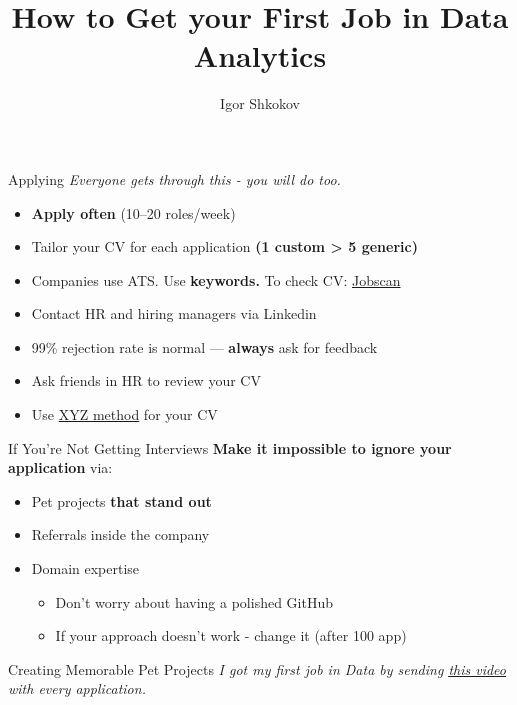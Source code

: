 \documentclass[10pt,a4paper]{article}
\date{} %
\title{How to Get your First Job in \textbf{Data Analytics}}
\author{Igor Shkokov}
\begin{document}
\small
\begin{multicols}{3}

\maketitle
\thispagestyle{empty}
\scriptsize

\begin{textbox}{Applying}
\emph{Everyone gets through this - you will do too.}
\begin{itemize}
    \item \textbf{Apply often} (10--20 roles/week)
    \item Tailor your CV for each application \textbf{(1 custom > 5 generic)}
    \item Companies use ATS. Use \textbf{keywords.} To check CV: \href{https://www.jobscan.co/}{Jobscan}
    \item Contact HR and hiring managers via Linkedin
    \item 99\% rejection rate is normal --- \textbf{always} ask for feedback
    \item Ask friends in HR to review your CV
    \item Use \href{https://www.tealhq.com/post/xyz-resume}{XYZ method} for your CV
\end{itemize}
\end{textbox}

\begin{textboxGray}{If You're Not Getting Interviews}
\textbf{Make it impossible to ignore your application} via:
\begin{itemize}
    \item Pet projects \textbf{that stand out}
    \item Referrals inside the company
    \item Domain expertise
	\begin{itemize}
    \item Don't worry about having a polished GitHub
    \item If your approach doesn’t work - change it (after 100 app)
	\end{itemize}
\end{itemize}
\end{textboxGray}

\begin{textboxRed}{Creating Memorable Pet Projects}
\emph{I got my first job in Data by sending \underline{\href{https://www.youtube.com/watch?v=54jvW1ulaP0&t=961s}{this video}} with every application.}


\end{textboxRed}
\end{multicols}
\end{document}
